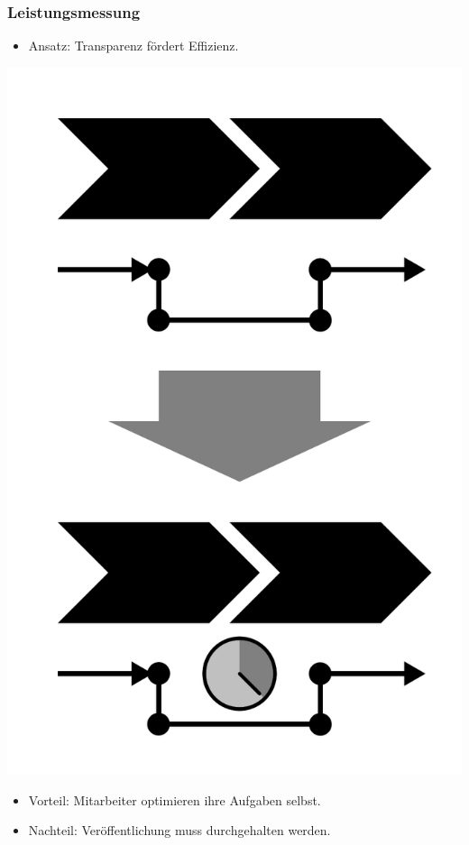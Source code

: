 \documentclass[xcolor=dvipsnames]{beamer}
\begin{document}
 \begin{frame}
  \frametitle{Leistungsmessung}
   \begin{itemize}
    \item Ansatz: Transparenz fördert Effizienz.
   \end{itemize}
  \centerline{\includegraphics[scale=2.5]{4_6_10.png}}
  \begin{itemize}
    \item Vorteil: Mitarbeiter optimieren ihre Aufgaben selbst.
    \item Nachteil: Veröffentlichung muss durchgehalten werden.
  \end{itemize}
 \end{frame}
\end{document}

